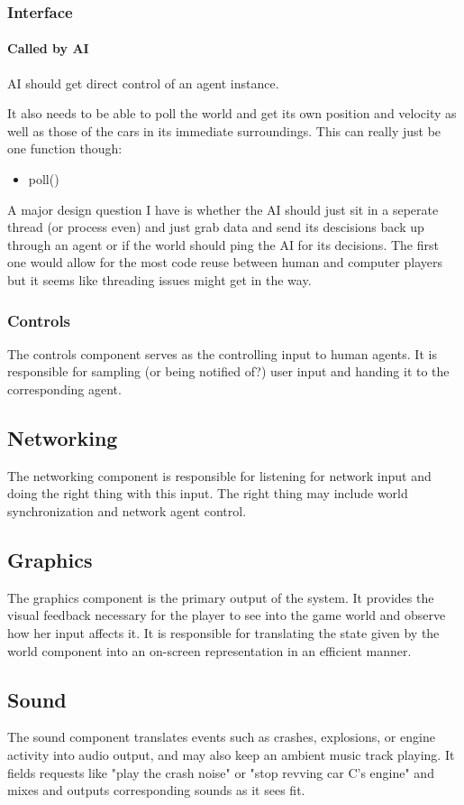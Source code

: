 \documentclass[12pt]{article}
\begin{document}
\subsubsection{Interface}

\paragraph{Called by AI}
AI should get direct control of an agent instance.

It also needs to be able to poll the world and get its own position and velocity as well as those of the cars in its immediate surroundings. This can really just be one function though:
\begin{itemize}
\item poll()
\end{itemize}
A major design question I have is whether the AI should just sit in a seperate thread (or process even) and just grab data and send its descisions back up through an agent or if the world should ping the AI for its decisions. The first one would allow for the most code reuse between human and computer players but it seems like threading issues might get in the way.

\subsubsection{Controls}
The controls component serves as the controlling input to human agents. It
is responsible for sampling (or being notified of?) user input and handing it
to the corresponding agent.
\subsection{Networking}
The networking component is responsible for listening for network input and
doing the right thing with this input. The right thing may include world
synchronization and network agent control.
\subsection{Graphics}
The graphics component is the primary output of the system. It provides the
visual feedback necessary for the player to see into the game world and observe
how her input affects it. It is responsible for translating the state given
by the world component into an on-screen representation in an efficient manner.
\subsection{Sound}
The sound component translates events such as crashes, explosions, or engine
activity into audio output, and may also keep an ambient music track playing.
It fields requests like "play the crash noise" or "stop revving car C's engine"
and mixes and outputs corresponding sounds as it sees fit.
\end{document}
